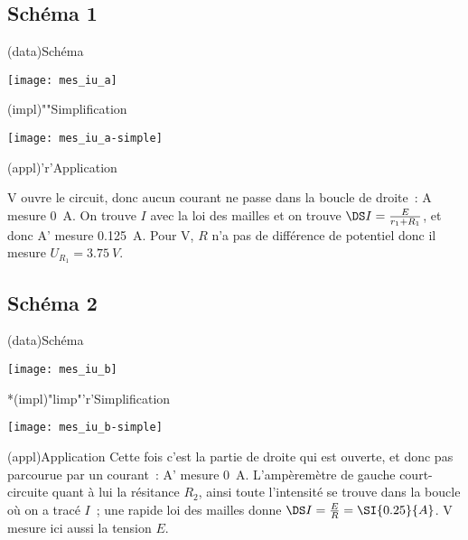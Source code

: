 \documentclass[../TDE1-E2.tex]{subfiles}%
\begin{document}
{\subsection{Schéma 1}
\begin{tcbraster}[raster columns=3, raster equal height=rows]
    \begin{tcn}(data){Schéma}
        \begin{center}
            \hspace*{-12pt}
            \texttt{[image: mes\_iu\_a]}
        \end{center}
    \end{tcn}
    \begin{tcn}(impl)""{Simplification}
        \begin{center}
            \hspace*{-12pt}
            \texttt{[image: mes\_iu\_a-simple]}
        \end{center}
    \end{tcn}
    \begin{tcn}(appl)'r'{Application}

        V ouvre le circuit, donc aucun courant ne passe dans la boucle de
        droite~: A mesure \SI{0}{A}. On trouve $I$ avec la loi des mailles et on
        trouve $\DS I = \frac{E}{r_1 + R_1}$, et donc A' mesure \SI{0.125}{A}.
        Pour V, $R$ n'a pas de différence de potentiel donc il mesure $U_{R_1}
        = \SI{3.75}{V}$.

    \end{tcn}
\end{tcbraster}
\subsection{Schéma 2}
\begin{tcbraster}[raster columns=2, raster equal height=rows]
    \begin{tcn}(data){Schéma}
        \begin{center}
            \texttt{[image: mes\_iu\_b]}
        \end{center}
    \end{tcn}
    \begin{tcn}*(impl)"limp"'r'{Simplification}
        \begin{center}
           \texttt{[image: mes\_iu\_b-simple]}
        \end{center} 
    \end{tcn}
\end{tcbraster}
\begin{center}
    \begin{tcn}[width=\linewidth](appl){Application}
        Cette fois c'est la partie de droite qui est ouverte, et donc pas
        parcourue par un courant~: A' mesure \SI{0}{A}. L'ampèremètre de gauche
        court-circuite quant à lui la résitance $R_2$, ainsi toute l'intensité
        se trouve dans la boucle où on a tracé \textcolor{brandeisblue}{$I$}~;
        une rapide loi des mailles donne $\DS I = \frac{E}{R} = \SI{0.25}{A}$. V
        mesure ici aussi la tension $E$.
    \end{tcn}
\end{center}
}
\end{document}
